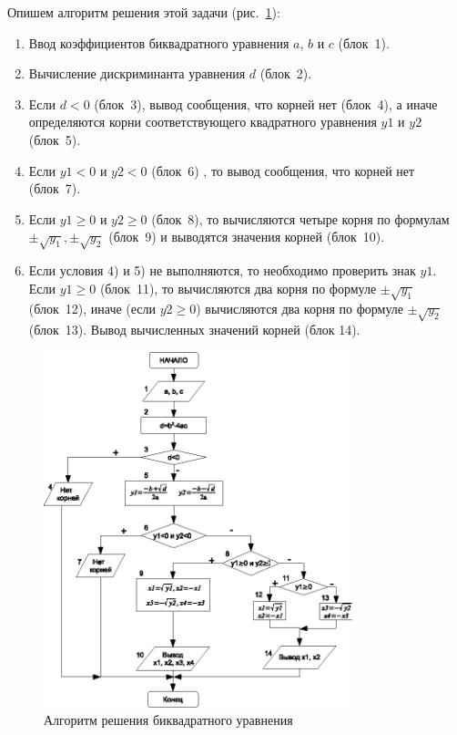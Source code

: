 Опишем алгоритм решения этой задачи (рис.~\ref{ch03:refDrawing19}):
\begin{enumerate}
\item Ввод коэффициентов биквадратного уравнения $a$, $b$ и $c$ (блок~1).
\item Вычисление дискриминанта уравнения $d$ (блок~2).
\item Если $d<0$ (блок~3), вывод сообщения, что корней нет (блок~4), а иначе определяются
корни соответствующего квадратного уравнения $y1$ и $y2$ (блок~5).
\item Если $y1<0$ и $y2<0$ (блок~6) , то вывод сообщения, что корней нет (блок~7).
\item Если $y1\geq 0$ и $y2\geq 0$ (блок~8), то вычисляются четыре корня по формулам  
$\pm\sqrt{y_1}, \pm\sqrt{y_2}$ (блок~9) и выводятся значения корней (блок~10).
\item Если условия 4) и 5) не выполняются, то необходимо проверить знак $y1$. Если
$y1\geq 0$ (блок~11), то вычисляются два корня по формуле  $\pm\sqrt{y_1}$ (блок~12), 
иначе (если  $y2\geq 0$) вычисляются два корня по формуле  $\pm\sqrt{y_2}$ (блок~13). Вывод вычисленных
значений корней (блок 14).
\end{enumerate}

\begin{figure}[htb]
\begin{center}
\includegraphics[width=0.8\textwidth]{img/ris_3_20}
\caption{Алгоритм решения биквадратного уравнения}
\label{ch03:refDrawing19}
\end{center}
\end{figure}

